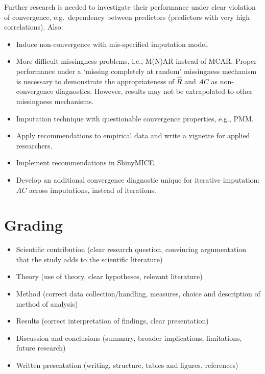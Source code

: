 \documentclass[Royal,times,sageh]{sagej}
\begin{document}
Further research is needed to investigate their performance under clear
violation of convergence, e.g.~dependency between predictors (predictors
with very high correlations). Also:

\begin{itemize}
\item
  Induce non-convergence with mis-specified imputation model.
\item
  More difficult missingness problems, i.e., M(N)AR instead of MCAR.
  Proper performance under a `missing completely at random' missingness
  mechanism is necessary to demonstrate the appropriateness of
  \(\widehat{R}\) and \(AC\) as non-convergence diagnostics. However,
  results may not be extrapolated to other missingness mechanisms.
\item
  Imputation technique with questionable convergence properties, e.g.,
  PMM.
\item
  Apply recommendations to empirical data and write a vignette for
  applied researchers.
\item
  Implement recommendations in ShinyMICE.
\item
  Develop an additional convergence diagnostic unique for iterative
  imputation: \(AC\) across imputations, instead of iterations.
\end{itemize}

\hypertarget{grading}{%
\section{Grading}\label{grading}}

\begin{itemize}
\item
  Scientific contribution (clear research question, convincing
  argumentation that the study adds to the scientific literature)
\item
  Theory (use of theory, clear hypotheses, relevant literature)
\item
  Method (correct data collection/handling, measures, choice and
  description of method of analysis)
\item
  Results (correct interpretation of findings, clear presentation)
\item
  Discussion and conclusions (summary, broader implications,
  limitations, future research)
\item
  Written presentation (writing, structure, tables and figures,
  references)
\end{itemize}



\end{document}
